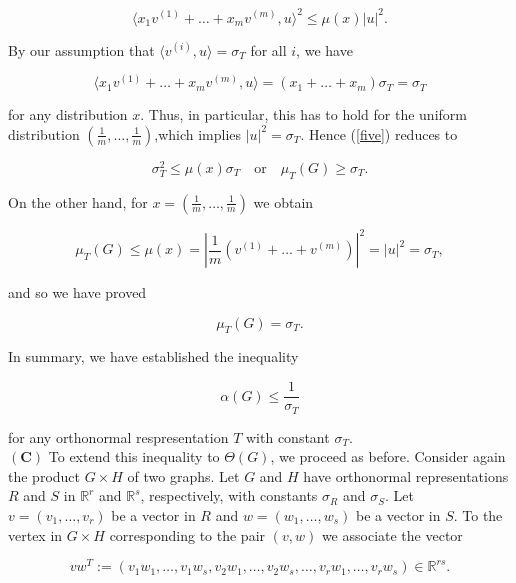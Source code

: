 \begin{equation}
  \langle x_{1}v^{(1)}+\ldots+x_{m}v^{(m)},u \rangle ^2 \leq \mu(x) |u|^2. \label{five} \label{five}
\end{equation}

By our assumption that $\langle v^{(i)}, u \rangle = \sigma_T$ for all $i$, we have

\[
\langle x_{1}v^{(1)}+\ldots+x_{m}v^{(m)},u\rangle = (x_1 + \ldots + x_m)\sigma_T = \sigma_T
\]

for any distribution $x$. Thus, in particular, this has to hold for the uniform 
distribution $(\frac{1}{m}, \ldots, \frac{1}{m})$,which implies $|u|^2 = \sigma_T$.
Hence (\ref{five}) reduces to 

\begin{equation*}
\sigma_T^2 \leq \mu(x)\sigma_T \quad \text{or} \quad \mu_{T}(G) \geq \sigma_T.
\end{equation*}

\setnewpagemargins
On the other hand, for $x = (\frac{1}{m}, \ldots, \frac{1}{m})$  we obtain

\[
\mu_{T}(G) \leq \mu(x) = |{\frac{1}{m}}(v^{(1)}+\ldots+v^{(m)})|^2 = |u|^2 = \sigma_T,
\]

and so we have proved 

\begin{equation}
\mu_{T}(G) = \sigma_T. \label{six}
\end{equation}

In summary, we have established the inequality 

\begin{equation}
    \alpha(G) \leq {\frac{1}{\sigma_T}} \label{seven}  
\end{equation}

for any orthonormal respresentation $T$ with constant $\sigma_T$.\\
$\mathbf{(C)}$ To extend this inequality to $\Theta(G)$, we proceed as before. Consider 
again the product $G \times H$ of two graphs. Let $G$ and $H$ have orthonormal 
representations $R$ and $S$ in $\mathbb{R}^r$ and $\mathbb{R}^s$, respectively, with constants $\sigma_R$ and $\sigma_S$.
Let $v = (v_1,\ldots,v_r)$ be a vector in $R$ and $w = (w_1,\ldots,w_s)$ be 
a vector in $S$. To the vertex in $G \times H$ corresponding to the pair $(v, w)$ we 
associate the vector

\[
vw^T := ({v_1}{w_1},\ldots,{v_1}{w_s},{v_2}{w_1},\ldots,{v_2}{w_s},\ldots,{v_r}{w_1},\ldots,{v_r}{w_s}) \in \mathbb{R}^{rs}.
\]

